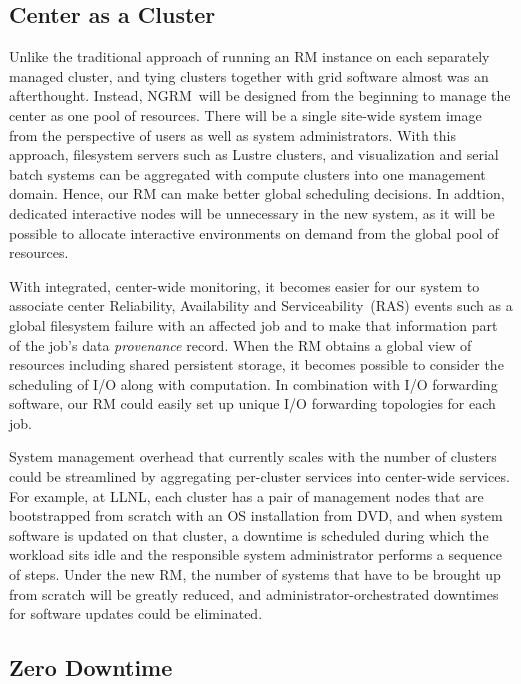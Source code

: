 \documentclass{article}
\newcommand{\ngrm}{NGRM}
\begin{document}
\subsection{Center as a Cluster}

Unlike the traditional approach of running an RM instance on each separately
managed cluster, and tying clusters together with grid software almost was
an afterthought. Instead, \ngrm\ will be designed from the beginning to manage the
center as one pool of resources. There will be a single site-wide 
system image from the perspective of users as well as system administrators.
With this approach, filesystem servers such as Lustre clusters, 
and visualization and serial batch systems can be aggregated
with compute clusters into one management domain. Hence,
our RM can make better global scheduling decisions. 
In addtion, dedicated interactive nodes will be unnecessary in the new system, as it
will be possible to allocate interactive environments on demand from the
global pool of resources.

With integrated, center-wide monitoring, it becomes easier
for our system to associate center Reliability, Availability and Serviceability~(RAS) 
events such as a global filesystem
failure with an affected job and to make that information part of
the job's data {\em provenance} record. When the RM obtains a global view of
resources including shared persistent storage, it becomes possible to
consider the scheduling of I/O along with computation. In combination with
I/O forwarding software, our RM could easily set up unique I/O forwarding
topologies for each job.

System management overhead that currently scales with the number of clusters
could be streamlined by aggregating per-cluster services into center-wide
services. For example, at LLNL, each cluster has a pair of management
nodes that are bootstrapped from scratch with an OS installation from DVD,
and when system software is updated on that cluster, a downtime is
scheduled during which the workload sits idle and the responsible system
administrator performs a sequence of steps. Under the new RM, the
number of systems that have to be brought up from scratch will be
greatly reduced, and administrator-orchestrated downtimes for software
updates could be eliminated. 


\subsection{Zero Downtime}
\end{document}
